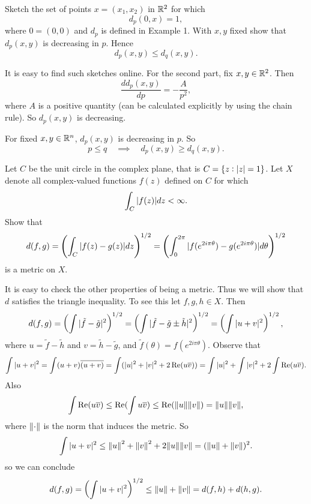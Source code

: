 \begin{problem}
	Sketch the set of points $ x=(x_1,x_2) $ in $ \mathbb{R}^2 $ for which 
	\[ d_p(0,x) = 1, \]
	where $ 0=(0,0) $ and $ d_p $ is defined in Example 1. With $ x,y $ fixed show that $ d_p(x,y) $ is decreasing in $ p $. Hence
	\[ d_p(x,y) \leq d_q(x,y). \]
\end{problem}
\begin{solution}
	It is easy to find such sketches online. For the second part, fix $ x,y\in \mathbb{R}^2 $. Then
	\[ \frac{d d_p(x,y)}{dp} = -\frac{A}{p^2}, \]
	where $ A $ is a positive quantity (can be calculated explicitly by using the chain rule). So $ d_p(x,y) $ is decreasing.
\end{solution}
\begin{summary}
	For fixed $ x,y\in \mathbb{R}^n $, $ d_p(x,y) $ is decreasing in $ p $. So 
	\[ p\leq q \quad \implies \quad d_p(x,y) \geq d_q(x,y). \]
\end{summary}

\begin{problem}
	Let $ C $ be the unit circle in the complex plane, that is $ C = \{z:|z|=1\} $. Let $ X $ denote all complex-valued functions $ f(z) $ defined on $ C $ for which
	\[ \int_C |f(z)|dz < \infty. \]
	Show that 
	\[ d(f,g) = \left(\int_C |f(z)-g(z)|dz\right)^{1/2} = \left(\int_{0}^{2\pi} |f(e^{2i\pi\theta}) - g(e^{2i\pi\theta})|d\theta \right)^{1/2}  \]
	is a metric on $ X $.
\end{problem}
\begin{solution}
	It is easy to check the other properties of being a metric. Thus we will show that $ d $ satisfies the triangle inequality. To see this let $ f,g,h \in X $. Then 
	\begin{align*}
		d(f,g) = \left( \int |\tilde{f} - \tilde{g}|^2  \right)^{1/2} = \left( \int |\tilde{f} -\tilde{g} \pm \tilde{h}|^2 \right)^{1/2} = \left( \int |u+v|^2  \right)^{1/2},
	\end{align*}
	where $ u = \tilde f - \tilde h $ and $ v = \tilde{h} - \tilde{g} $, and $ \tilde{f}(\theta) = f(e^{2i\pi\theta}) $. Observe that
	\[ \int |u+v|^2 = \int (u+v) \overline{(u+v)} = \int (|u|^2 + |v|^2 + 2\operatorname{Re}(u\overline{v})) = \int |u|^2 + \int |v|^2 + 2\int \operatorname{Re}(u\overline{v}).\]
	Also
	\[ \int \operatorname{Re}(u\overline{v}) \leq \operatorname{Re}( \int u\overline{v}) \leq \operatorname{Re}(\norm{u}\norm{v}) = \norm{u}\norm{v},  \]
	where $ \norm{\cdot} $ is the norm that induces the metric. So
	\[ \int |u+v|^2 \leq \norm{u}^2 + \norm{v}^2 + 2\norm{u}\norm{v} = (\norm{u} + \norm{v})^2. \]
	so we can conclude
	\[ d(f,g) = \left( \int |u+v|^2 \right)^{1/2} \leq \norm{u} + \norm{v} = d(f,h) + d(h,g). \]
\end{solution}

